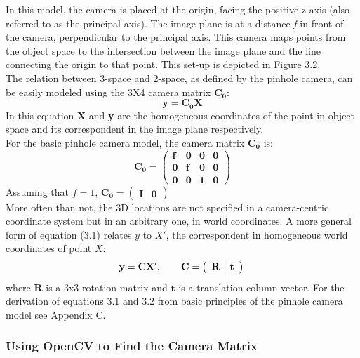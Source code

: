 \documentclass[12pt,a4paper,twoside,openright]{report}
\begin{document}
In this model, the camera is placed at the origin, facing the positive z-axis (also referred to as the principal axis). The image plane is at a distance \emph{f} in front of the camera, perpendicular to the principal axis. This camera maps points from the object space to the intersection between the image plane and the line connecting the origin to that point. This set-up is depicted in Figure 3.2.\\
\linebreak
The relation between 3-space and 2-space, as defined by the pinhole camera, can be easily modeled using the 3X4 camera matrix $\mathbf{C_{0}}$: 
\begin{equation}
\mathbf{y = C_{0}X}
\end{equation}
In this equation \textbf{X} and \textbf{y} are the homogeneous coordinates of the point in object space and its correspondent in the image plane respectively.\\
For the basic pinhole camera model, the camera matrix $\mathbf{C_{0}}$ is:
\[ \mathbf{C_{0}=\left(\begin{array}{cccc}
f & 0 & 0 & 0 \\
0 & f & 0 & 0 \\
0 & 0 & 1 & 0\end{array} \right)}\] 
Assuming that $f = 1$, $\mathbf{C_{0}} = \left ( \begin{array} {c|c} \mathbf{I} & \mathbf{0} \end{array} \right )$
\\
\linebreak
More often than not, the 3D locations are not specified in a camera-centric coordinate system but in an arbitrary one, in world coordinates. A more general form of equation (3.1) relates $y$ to $X'$, the correspondent in homogeneous world coordinates of point $X$:
\begin{equation}
\mathbf{y = CX'},\hspace{20pt} \mathbf{C} = \left ( \begin{array} {c|c} \mathbf{R} & \mathbf{t} \end{array} \right )\\
\end{equation} where $\mathbf{R}$ is a 3x3 rotation matrix and $\mathbf{t}$ is a translation column vector. For the derivation of equations 3.1 and 3.2 from basic principles of the pinhole camera model see Appendix C.\\

\subsubsection{Using OpenCV to Find the Camera Matrix}
\cite[p.~129]{baggio2012mastering}
\end{document}

